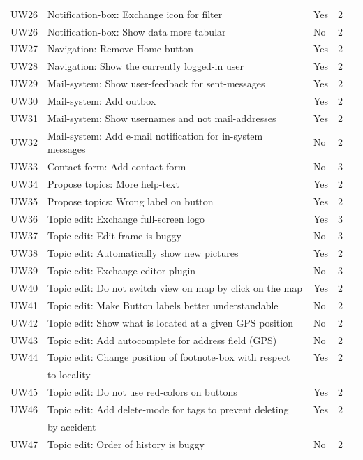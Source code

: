 {\begin{landscape}
\begin{center}
\begin{longtable}{|l|l|lll|}
	UW26 & Notification-box: Exchange icon for filter  & Yes & 2 \\
	UW26 & Notification-box: Show data more tabular  & No & 2 \\
	UW27 & Navigation: Remove Home-button  & Yes & 2 \\
	UW28 & Navigation: Show the currently logged-in user  & Yes & 2 \\
	UW29 & Mail-system: Show user-feedback for sent-messages & Yes & 2 \\
	UW30 & Mail-system: Add outbox  & Yes & 2 \\	
	UW31 & Mail-system: Show usernames and not mail-addresses  & Yes & 2 \\
	UW32 & Mail-system: Add e-mail notification for in-system messages  & No & 2 \\
	UW33 & Contact form: Add contact form  & No & 3 \\
	UW34 & Propose topics: More help-text & Yes & 2 \\
	UW35 & Propose topics: Wrong label on button  & Yes & 2 \\
	UW36 & Topic edit: Exchange full-screen logo  & Yes & 3 \\
	UW37 & Topic edit: Edit-frame is buggy  & No & 3 \\
	UW38 & Topic edit: Automatically show new pictures  & Yes & 2 \\
	UW39 & Topic edit: Exchange editor-plugin  & No & 3 \\
	UW40 & Topic edit: Do not switch view on map by click on the map  & Yes & 2 \\
	UW41 & Topic edit: Make Button labels better understandable  & No & 2 \\
	UW42 & Topic edit: Show what is located at a given GPS position & No & 2 \\
	UW43 & Topic edit: Add autocomplete for address field (GPS) & No & 2 \\
	UW44 & Topic edit: Change position of footnote-box with respect  & Yes & 2 \\
	& to locality  &  &  \\
	UW45 & Topic edit: Do not use red-colors on buttons & Yes & 2 \\
	UW46 & Topic edit: Add delete-mode for tags to prevent deleting & Yes & 2 \\
	& by accident   &  &  \\
	UW47 & Topic edit: Order of history is buggy  & No & 2 \\
\end{longtable}
\end{center} 
    \end{landscape}
    \clearpage%
}

